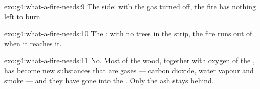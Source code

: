 \begin{solution}{exo:g4:what-a-fire-needs:9}
The  side: with the gas turned off, the fire has nothing left to
burn.
\end{solution}

\begin{solution}{exo:g4:what-a-fire-needs:10}
The : with no trees in the strip, the fire runs out of  when it
reaches it.
\end{solution}

\begin{solution}{exo:g4:what-a-fire-needs:11}
No. Most of the wood, together with oxygen of the , has become new
substances that are gases --- carbon dioxide, water vapour and smoke ---
and they have gone into the . Only the ash stays behind.
\end{solution}
